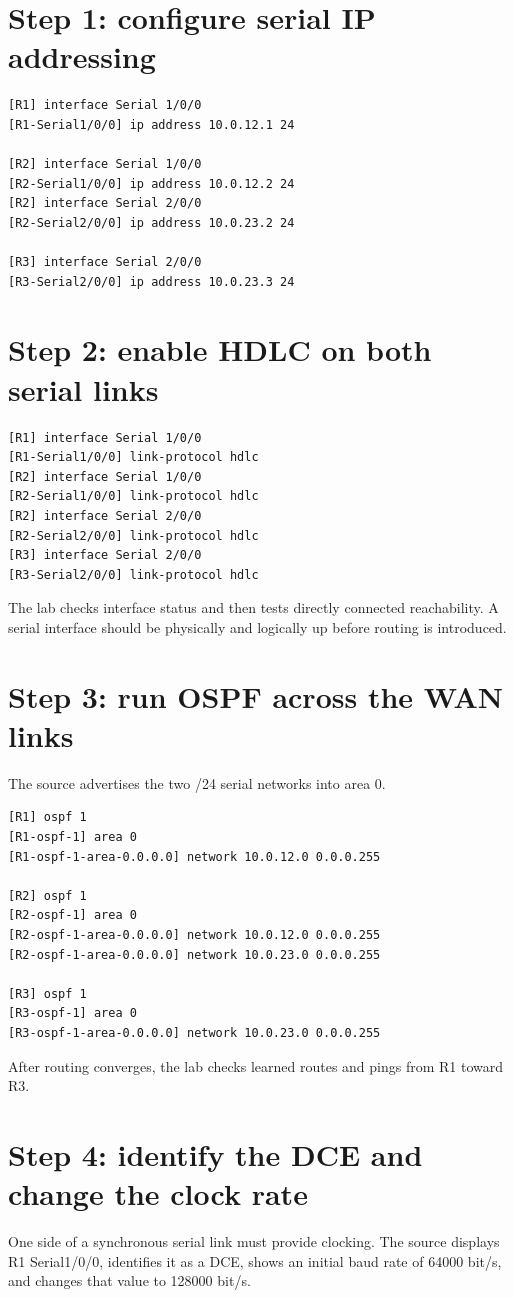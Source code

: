 \section{Step 1: configure serial IP addressing}
\begin{lstlisting}[style=dcnterminal]
[R1] interface Serial 1/0/0
[R1-Serial1/0/0] ip address 10.0.12.1 24

[R2] interface Serial 1/0/0
[R2-Serial1/0/0] ip address 10.0.12.2 24
[R2] interface Serial 2/0/0
[R2-Serial2/0/0] ip address 10.0.23.2 24

[R3] interface Serial 2/0/0
[R3-Serial2/0/0] ip address 10.0.23.3 24
\end{lstlisting}

\section{Step 2: enable HDLC on both serial links}
\begin{lstlisting}[style=dcnterminal]
[R1] interface Serial 1/0/0
[R1-Serial1/0/0] link-protocol hdlc
[R2] interface Serial 1/0/0
[R2-Serial1/0/0] link-protocol hdlc
[R2] interface Serial 2/0/0
[R2-Serial2/0/0] link-protocol hdlc
[R3] interface Serial 2/0/0
[R3-Serial2/0/0] link-protocol hdlc
\end{lstlisting}
The lab checks interface status and then tests directly connected reachability. A serial interface should be physically and logically up before routing is introduced.

\section{Step 3: run OSPF across the WAN links}
The source advertises the two /24 serial networks into area 0.
\begin{lstlisting}[style=dcnterminal]
[R1] ospf 1
[R1-ospf-1] area 0
[R1-ospf-1-area-0.0.0.0] network 10.0.12.0 0.0.0.255

[R2] ospf 1
[R2-ospf-1] area 0
[R2-ospf-1-area-0.0.0.0] network 10.0.12.0 0.0.0.255
[R2-ospf-1-area-0.0.0.0] network 10.0.23.0 0.0.0.255

[R3] ospf 1
[R3-ospf-1] area 0
[R3-ospf-1-area-0.0.0.0] network 10.0.23.0 0.0.0.255
\end{lstlisting}
After routing converges, the lab checks learned routes and pings from R1 toward R3.

\section{Step 4: identify the DCE and change the clock rate}
One side of a synchronous serial link must provide clocking. The source displays R1 Serial1/0/0, identifies it as a DCE, shows an initial baud rate of 64000 bit/s, and changes that value to 128000 bit/s.

